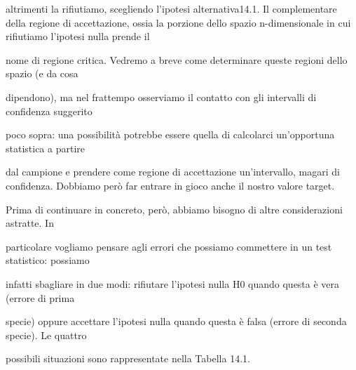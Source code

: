 \documentclass[a4paper,portrait,12pt]{article}
\begin{document}
\begin{flushleft}
altrimenti la rifiutiamo, scegliendo l'ipotesi alternativa14.1. Il complementare della regione di accettazione, ossia la porzione dello spazio n-dimensionale in cui rifiutiamo l'ipotesi nulla prende il
\end{flushleft}


\begin{flushleft}
nome di regione critica. Vedremo a breve come determinare queste regioni dello spazio (e da cosa
\end{flushleft}


\begin{flushleft}
dipendono), ma nel frattempo osserviamo il contatto con gli intervalli di confidenza suggerito
\end{flushleft}


\begin{flushleft}
poco sopra: una possibilit\`{a} potrebbe essere quella di calcolarci un'opportuna statistica a partire
\end{flushleft}


\begin{flushleft}
dal campione e prendere come regione di accettazione un'intervallo, magari di confidenza. Dobbiamo per\`{o} far entrare in gioco anche il nostro valore target.
\end{flushleft}


\begin{flushleft}
Prima di continuare in concreto, per\`{o}, abbiamo bisogno di altre considerazioni astratte. In
\end{flushleft}


\begin{flushleft}
particolare vogliamo pensare agli errori che possiamo commettere in un test statistico: possiamo
\end{flushleft}


\begin{flushleft}
infatti sbagliare in due modi: rifiutare l'ipotesi nulla H0 quando questa \`{e} vera (errore di prima
\end{flushleft}


\begin{flushleft}
specie) oppure accettare l'ipotesi nulla quando questa \`{e} falsa (errore di seconda specie). Le quattro
\end{flushleft}


\begin{flushleft}
possibili situazioni sono rappresentate nella Tabella 14.1.
\end{flushleft}
\end{document}

